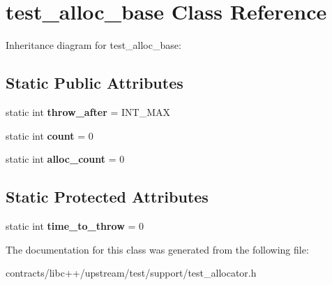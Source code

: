 \hypertarget{classtest__alloc__base}{}\section{test\+\_\+alloc\+\_\+base Class Reference}
\label{classtest__alloc__base}


Inheritance diagram for test\+\_\+alloc\+\_\+base\+:
\subsection*{Static Public Attributes}
\begin{DoxyCompactItemize}
\item 
\mbox{\label{classtest__alloc__base_afcc27b59713f9d07057ff089cfafaea4}} 
static int {\bfseries throw\+\_\+after} = I\+N\+T\+\_\+\+M\+AX
\item 
\mbox{\label{classtest__alloc__base_a02cfc810510f23f47cbf2564139a6f5a}} 
static int {\bfseries count} = 0
\item 
\mbox{\label{classtest__alloc__base_a9a3bf5eed7f89d6de340875e8a084ce1}} 
static int {\bfseries alloc\+\_\+count} = 0
\end{DoxyCompactItemize}
\subsection*{Static Protected Attributes}
\begin{DoxyCompactItemize}
\item 
\mbox{\label{classtest__alloc__base_a7f0e8a2cc06cc97f587b73c3b57da7a3}} 
static int {\bfseries time\+\_\+to\+\_\+throw} = 0
\end{DoxyCompactItemize}


The documentation for this class was generated from the following file\+:\begin{DoxyCompactItemize}
\item 
contracts/libc++/upstream/test/support/test\+\_\+allocator.\+h\end{DoxyCompactItemize}
